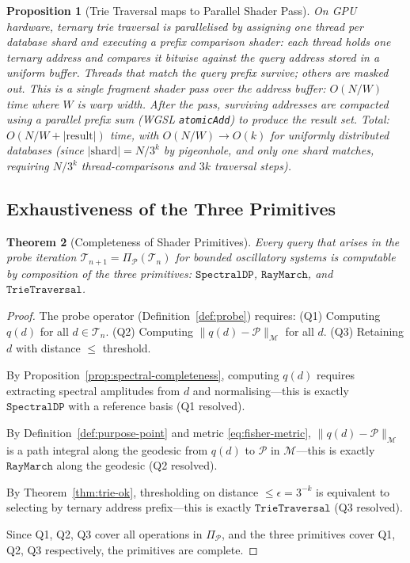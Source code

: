 \documentclass[10pt,twocolumn]{article}
\newtheorem{theorem}{Theorem}[section]
\newtheorem{proposition}[theorem]{Proposition}
\newcommand{\ProbeOp}{\Pi_\mathcal{P}}
\newcommand{\TruthCell}{\mathcal{T}}
\newcommand{\PurposePoint}{\mathcal{P}}
\newcommand{\ManifoldM}{\mathcal{M}}
\begin{document}
\begin{proposition}[Trie Traversal maps to Parallel Shader Pass]
\label{prop:trie-shader}
On GPU hardware, ternary trie traversal is parallelised by
assigning one thread per database shard and executing a
\emph{prefix comparison shader}: each thread holds one ternary address
and compares it bitwise against the query address stored in a uniform buffer.
Threads that match the query prefix survive; others are masked out.
This is a single fragment shader pass over the address buffer:
$O(N/W)$ time where $W$ is warp width.
After the pass, surviving addresses are compacted using a parallel prefix sum
(WGSL \texttt{atomicAdd}) to produce the result set.
Total: $O(N/W + |\text{result}|)$ time, with $O(N/W) \to O(k)$
for uniformly distributed databases (since $|\text{shard}| = N / 3^k$
by pigeonhole, and only one shard matches, requiring
$N / 3^k$ thread-comparisons and $3k$ traversal steps).
\end{proposition}

\subsection{Exhaustiveness of the Three Primitives}

\begin{theorem}[Completeness of Shader Primitives]
\label{thm:completeness}
Every query that arises in the probe iteration $\TruthCell_{n+1} = \ProbeOp(\TruthCell_n)$
for bounded oscillatory systems is computable by composition of
the three primitives: $\mathtt{SpectralDP}$, $\mathtt{RayMarch}$, and
$\mathtt{TrieTraversal}$.
\end{theorem}

\begin{proof}
The probe operator (Definition~\ref{def:probe}) requires:
(Q1) Computing $q(d)$ for all $d \in \TruthCell_n$.
(Q2) Computing $\|q(d) - \PurposePoint\|_\ManifoldM$ for all $d$.
(Q3) Retaining $d$ with distance $\leq$ threshold.

By Proposition~\ref{prop:spectral-completeness}, computing $q(d)$ requires
extracting spectral amplitudes from $d$ and normalising---this is exactly
$\mathtt{SpectralDP}$ with a reference basis (Q1 resolved).

By Definition~\ref{def:purpose-point} and metric \eqref{eq:fisher-metric},
$\|q(d) - \PurposePoint\|_\ManifoldM$ is a path integral along the geodesic
from $q(d)$ to $\PurposePoint$ in $\ManifoldM$---this is exactly
$\mathtt{RayMarch}$ along the geodesic (Q2 resolved).

By Theorem~\ref{thm:trie-ok}, thresholding on distance $\leq \epsilon = 3^{-k}$
is equivalent to selecting by ternary address prefix---this is exactly
$\mathtt{TrieTraversal}$ (Q3 resolved).

Since Q1, Q2, Q3 cover all operations in $\ProbeOp$, and the three
primitives cover Q1, Q2, Q3 respectively, the primitives are complete.
\end{proof}
\end{document}
